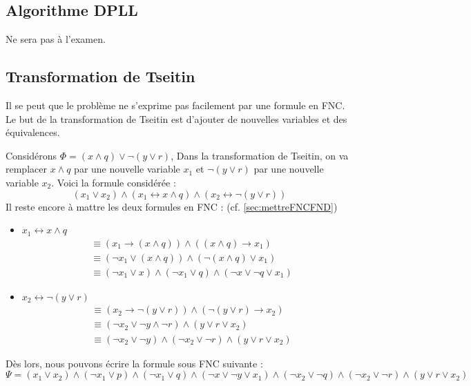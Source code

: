 \subsection{Algorithme DPLL}
Ne sera pas à l'examen.

\subsection{Transformation de Tseitin}
Il se peut que le problème ne s'exprime pas facilement par une formule en FNC. Le but de la transformation de Tseitin est d'ajouter de nouvelles variables et des équivalences.
\begin{example}
    Considérons $\Phi = (x \wedge q) \vee \neg(y \vee r)$, Dans la transformation de Tseitin, on va remplacer $x \wedge q$ par une nouvelle variable $x_1$ et $\neg(y \vee r)$ par une nouvelle variable $x_2$. Voici la formule considérée :
    \begin{equation*}
        (x_1\vee x_2) \wedge (x_1 \leftrightarrow x\wedge q) \wedge (x_2 \leftrightarrow \neg(y\vee r))
    \end{equation*}
    Il reste encore à mattre les deux formules en FNC : (cf. \ref{sec:mettreFNCFND})
    \begin{itemize}[label=\textbullet]
        \item $x_1 \leftrightarrow x \wedge q$
        \begin{equation*}
            \begin{aligned}
                &\equiv (x_1 \rightarrow (x \wedge q)) \wedge ((x \wedge q) \rightarrow x_1) \\
                &\equiv (\neg x_1 \vee (x \wedge q)) \wedge (\neg(x \wedge q) \vee x_1) \\
                &\equiv (\neg x_1 \vee x) \wedge (\neg x_1 \vee q) \wedge (\neg x \vee \neg q \vee x_1)
            \end{aligned}
        \end{equation*}
        \item $x_2 \leftrightarrow \neg(y\vee r)$
        \begin{equation*}
            \begin{aligned}
                &\equiv (x_2 \rightarrow \neg(y\vee r)) \wedge (\neg(y\vee r) \rightarrow x_2) \\
                &\equiv (\neg x_2 \vee \neg y \wedge \neg r)\wedge (y \vee r \vee x_2) \\
                &\equiv (\neg x_2 \vee \neg y) \wedge (\neg x_2 \vee \neg r) \wedge (y \vee r \vee x_2)
            \end{aligned}
        \end{equation*}
    \end{itemize}
    Dès lors, nous pouvons écrire la formule sous FNC suivante :
    \begin{equation*}
        \Psi = (x_1\vee x_2)\wedge(\neg x_1 \vee p)\wedge(\neg x_1\vee q)\wedge(\neg x \vee \neg y \vee x_1)\wedge(\neg x_2 \vee \neg q) \wedge (\neg x_2 \vee \neg r) \wedge (y \vee r \vee x_2)
    \end{equation*}
\end{example}
